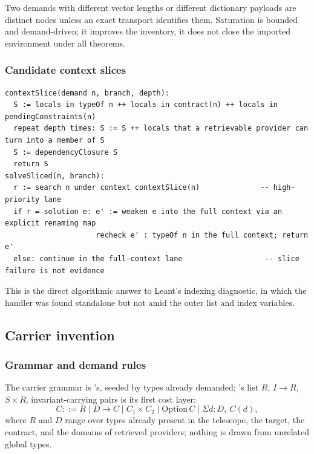 Two demands with different vector lengths or different dictionary payloads are distinct nodes unless an exact transport identifies them. Saturation is bounded and demand-driven; it improves the inventory, it does not close the imported environment under all theorems.

\subsubsection{Candidate context slices}

\begin{lstlisting}
contextSlice(demand n, branch, depth):
  S := locals in typeOf n ++ locals in contract(n) ++ locals in pendingConstraints(n)
  repeat depth times: S := S ++ locals that a retrievable provider can turn into a member of S
  S := dependencyClosure S
  return S
solveSliced(n, branch):
  r := search n under context contextSlice(n)              -- high-priority lane
  if r = solution e: e' := weaken e into the full context via an explicit renaming map
                     recheck e' : typeOf n in the full context; return e'
  else: continue in the full-context lane                   -- slice failure is not evidence
\end{lstlisting}

This is the direct algorithmic answer to Leant's indexing diagnostic, in which the handler was found standalone but not amid the outer list and index variables.

\subsection{Carrier invention}\label{alg:carriers-alg}

\subsubsection{Grammar and demand rules}

The carrier grammar is 's, seeded by types already demanded; 's list $R$, $I \to R$, $S \times R$, invariant-carrying pairs is its first cost layer:
\[
C ::= R \mid D \to C \mid C_1 \times C_2 \mid \mathrm{Option}\,C \mid \Sigma d{:}D,\ C(d),
\]
where $R$ and $D$ range over types already present in the telescope, the target, the contract, and the domains of retrieved providers; nothing is drawn from unrelated global types.

